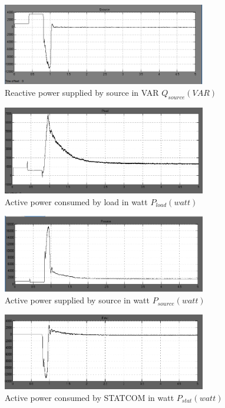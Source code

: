 \documentclass[journal,twoside]{IEEEtran}
\begin{document}
\begin{figure}[!ht]
\includegraphics[width=3.5in]{c}
\caption{Reactive power supplied by source in VAR $Q_{source}(VAR)$}
\label{fc }
\end{figure}


\begin{figure}[!ht]
\includegraphics[width=3.5in]{d}
\caption{Active power consumed by load in watt $P_{load}(watt)$}
\label{fd }
\end{figure}

\begin{figure}[!ht]
\includegraphics[width=3.5in]{e}
\caption{Active power supplied by source in watt $P_{source}(watt)$}
\label{fe }
\end{figure}


\begin{figure}[!ht]
\includegraphics[width=3.5in]{f}
\caption{Active power consumed by STATCOM in watt $P_{stat}(watt)$}
\label{ff }
\end{figure}
\end{document}
